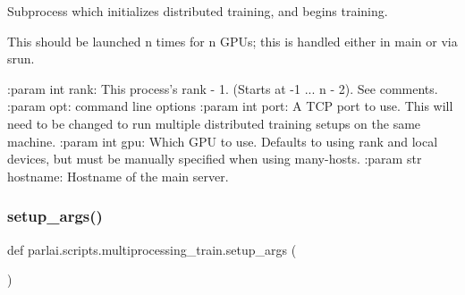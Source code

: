 \begin{DoxyVerb}Subprocess which initializes distributed training, and begins training.

This should be launched n times for n GPUs; this is handled either in main
or via srun.

:param int rank: This process's rank - 1. (Starts at -1 ... n - 2). See comments.
:param opt: command line options
:param int port: A TCP port to use. This will need to be changed to run
    multiple distributed training setups on the same machine.
:param int gpu: Which GPU to use. Defaults to using rank and local devices,
    but must be manually specified when using many-hosts.
:param str hostname: Hostname of the main server.
\end{DoxyVerb}
 \mbox{\label{namespaceparlai_1_1scripts_1_1multiprocessing__train_a1ee26bddeb470040cfbceb5ee7a9fa08}} 
\subsubsection{\texorpdfstring{setup\+\_\+args()}{setup\_args()}}
{\footnotesize\ttfamily def parlai.\+scripts.\+multiprocessing\+\_\+train.\+setup\+\_\+args (\begin{DoxyParamCaption}{ }\end{DoxyParamCaption})}

